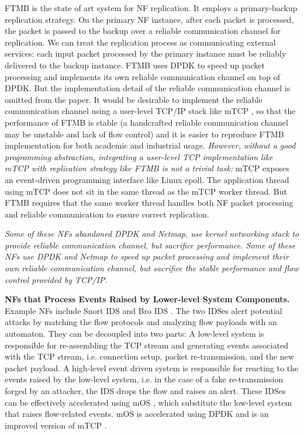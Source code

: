FTMB \cite{sherry2015rollback} is the state of art system for NF replication. It
employs a primary-backup replication strategy. On the primary NF instance,
after each packet is processed, the packet is passed to the backup over a
reliable communication channel for replication. We can treat the replication
process as communicating external services: each input packet processed by the
primary instance must be reliably delivered to the backup instance. FTMB uses
DPDK to speed up packet processing and implements its own reliable communication
channel on top of DPDK. But the implementation detail of the reliable
communication channel is omitted from the paper. It would be desirable to
implement the reliable communication channel using a user-level TCP/IP stack
like mTCP \cite{179773}, so that the performance of FTMB is stable (a
handcrafted reliable communication channel may be unstable and lack of flow
control) and it is easier to reproduce FTMB implementation for both academic and
industrial usage. \textit{However, without a good programming abstraction,
  integrating a user-level TCP implementation like mTCP with replication
  strategy like FTMB is not a trivial task:} mTCP exposes an event-driven
programming interface like Linux epoll. The application thread using mTCP does
not sit in the same thread as the mTCP worker thread. But FTMB requires that the
same worker thread handles both NF packet processing and reliable communication
to ensure correct replication.

\textit{Some of these NFs abandoned DPDK
  and Netmap, use kernel networking stack to provide reliable communication
  channel, but sacrifice performance. Some of these NFs use DPDK and Netmap to
  speed up packet processing and implement their own reliable communication
  channel, but sacrifice the stable performance and flow control provided by TCP/IP. }



\noindent \textbf{NFs that Process Events Raised by Lower-level System
  Components.} Example NFs include Snort IDS \cite{snort} and Bro IDS
\cite{bro}. The two IDSes alert potential attacks by matching the flow protocols
and analyzing flow payloads with an automaton. They can be decoupled into two
parts: A low-level system is responsible for re-assembling the TCP stream and
generating events associated with the TCP stream, i.e. connection setup,
packet re-transmission, and the new packet payload. A high-level event driven
system is responsible for reacting to the events raised by the low-level system,
i.e. in the case of a fake re-transmission forged by an attacker, the IDS drops the
flow and raises an alert. These IDSes can be effectively accelerated using mOS
\cite{201546}, which substitute the low-level system that raises flow-related
events. mOS is accelerated using DPDK and is an improved version of mTCP \cite{179773}.

